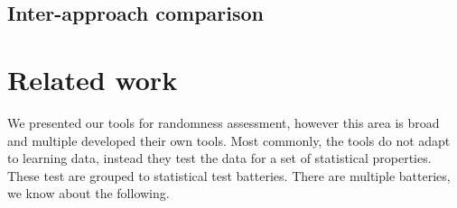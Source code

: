 \documentclass[
  print, %
  Table,   %
  nolof,     %
  nolot,     %
  11pt, %
  oneside  %
]{fithesis3}
\begin{document}

\section{Inter-approach comparison}
\label{sec:res-comp}

\chapter{Related work}
\label{chap:relatwork}

We presented our tools for randomness assessment, however this area is broad and multiple developed their own tools. Most commonly, the tools do not adapt to learning data, instead they test the data for  a set of statistical properties. These test are grouped to statistical test batteries. There are multiple batteries, we know about the following.

\end{document}
